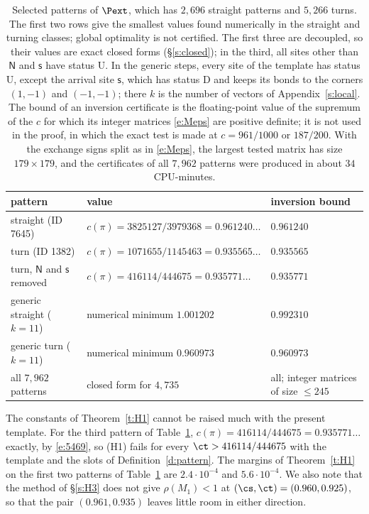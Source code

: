 \begin{table}[ht]
\centering
\small
\begin{tabular}{lll}
pattern & value & inversion bound \\ \hline
straight (ID 7645) & $c(\pi) = 3825127/3979368 = 0.961240\ldots$ & $0.961240$ \\
turn (ID 1382) & $c(\pi) = 1071655/1145463 = 0.935565\ldots$ & $0.935565$ \\
turn, $\mathsf N$ and $\mathsf s$ removed & $c(\pi) = 416114/444675 = 0.935771\ldots$ & $0.935771$ \\
generic straight ($k = 11$) & numerical minimum $1.001202$ & $0.992310$ \\
generic turn ($k = 11$) & numerical minimum $0.960973$ & $0.960973$ \\ \hline
all $7{,}962$ patterns & closed form for $4{,}735$ & all; integer matrices of size $\le 245$
\end{tabular}
\caption{Selected patterns of $\Pext$, which has $2{,}696$ straight patterns and $5{,}266$ turns. The first two rows give the smallest values found numerically in the straight and turning classes; global optimality is not certified. The first three are decoupled, so their values are exact closed forms (\S\ref{s:closed}); in the third, all sites other than $\mathsf N$ and $\mathsf s$ have status $\mathrm U$. In the generic steps, every site of the template has status $\mathrm U$, except the arrival site $\mathsf s$, which has status $\mathrm D$ and keeps its bonds to the corners $(1, -1)$ and $(-1, -1)$; there $k$ is the number of vectors of Appendix~\ref{s:local}. The bound of an inversion certificate is the floating-point value of the supremum of the $c$ for which its integer matrices \eqref{e:Meps} are positive definite; it is not used in the proof, in which the exact test is made at $c = 961/1000$ or $187/200$. With the exchange signs split as in \eqref{e:Meps}, the largest tested matrix has size $179 \times 179$, and the certificates of all $7{,}962$ patterns were produced in about $34$ CPU-minutes.}\label{tab:H1}
\end{table}

\begin{remark}\label{r:H1sharp}
The constants of Theorem~\ref{t:H1} cannot be raised much with the present template. For the third pattern of Table~\ref{tab:H1}, $c(\pi) = 416114/444675 = 0.935771\ldots$ exactly, by \eqref{e:5469}, so (H1) fails for every $\ct > 416114/444675$ with the template and the slots of Definition~\ref{d:pattern}. The margins of Theorem~\ref{t:H1} on the first two patterns of Table~\ref{tab:H1} are $2.4 \cdot 10^{-4}$ and $5.6 \cdot 10^{-4}$. We also note that the method of \S\ref{s:H3} does not give $\rho(M_1) < 1$ at $(\cs, \ct) = (0.960, 0.925)$, so that the pair $(0.961, 0.935)$ leaves little room in either direction.
\end{remark}
